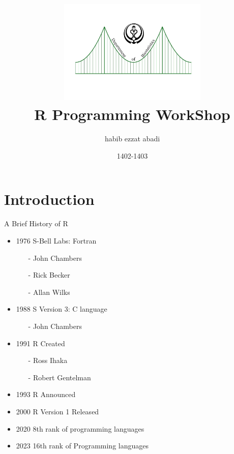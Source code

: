 \documentclass{beamer}\usepackage[]{graphicx}\usepackage[]{xcolor}
\date{\small 1402-1403\\[0.5cm]}
\title[R WorkShop]{\includegraphics[height = 5cm, width = 8cm]{Logo_Sums_BioStatistics.pdf}\\  R Programming WorkShop}
\author{habib ezzat abadi}
\institute{Shiraz University of Medical Scinece}
\begin{document}
\frame[plain]{\maketitle}
\section{Introduction}
\begin{frame}{A Brief History of R}
 \begin{itemize}
\item 1976 S-Bell Labs: Fortran 
\begin{itemize}
\item[-]John Chambers
\item[-] Rick Becker
\item[-] Allan Wilks 
\end{itemize}
\item 1988 S Version 3: C language 
\begin{itemize}
    \item[-] John Chambers 
\end{itemize}
\item 1991 R Created 
\begin{itemize}
    \item[-] Ross Ihaka
    \item[-] Robert Gentelman 
\end{itemize}
\item 1993 R Announced
\item 2000 R Version 1 Released
\item 2020 8th rank of programming languages
\item 2023 16th rank of Programming languages
 \end{itemize}   
\end{frame}
\end{document}
